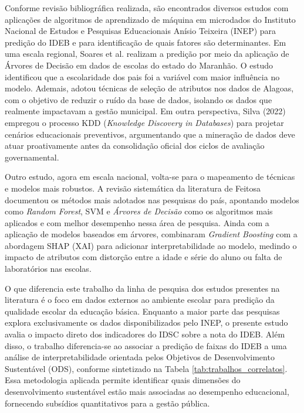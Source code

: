 Conforme revisão bibliográfica realizada, são encontrados diversos estudos com aplicações de algoritmos de aprendizado de máquina em microdados do Instituto Nacional de Estudos e Pesquisas Educacionais Anísio Teixeira (INEP) para predição do IDEB e para identificação de quais fatores são determinantes. Em uma escala regional, Soares et al.  realizam a predição por meio da aplicação de Árvores de Decisão em dados de escolas do estado do Maranhão. O estudo identificou que a escolaridade dos pais foi a variável com maior influência no modelo. Ademais,  adotou técnicas de seleção de atributos nos dados de Alagoas, com o objetivo de reduzir o ruído da base de dados, isolando os dados que realmente impactavam a gestão municipal. Em outra perspectiva, Silva (2022) empregou o processo KDD (\textit{Knowledge Discovery in Databases}) para projetar cenários educacionais preventivos, argumentando que a mineração de dados deve atuar proativamente antes da consolidação oficial dos ciclos de avaliação governamental.

Outro estudo, agora em escala nacional, volta-se para o mapeamento de técnicas e modelos mais robustos. A revisão sistemática da literatura de Feitosa  documentou os métodos mais adotados nas pesquisas do país, apontando modelos como \textit{Random Forest}, SVM e \textit{Árvores de Decisão} como os algoritmos mais aplicados e com melhor desempenho nessa área de pesquisa. Ainda com a aplicação de modelos baseados em árvores,  combinaram \textit{Gradient Boosting} com a abordagem SHAP (XAI) para adicionar interpretabilidade ao modelo, medindo o impacto de atributos com distorção entre a idade e série do aluno ou falta de laboratórios nas escolas. 

O que diferencia este trabalho da linha de pesquisa dos estudos presentes na literatura é o foco em dados externos ao ambiente escolar para predição da qualidade escolar da educação básica. Enquanto a maior parte das pesquisas explora exclusivamente os dados disponibilizados pelo INEP, o presente estudo avalia o impacto direto dos indicadores do IDSC sobre a nota do IDEB. Além disso, o trabalho diferencia-se ao associar a predição de faixas do IDEB a uma análise de interpretabilidade orientada pelos Objetivos de Desenvolvimento Sustentável (ODS), conforme sintetizado na Tabela \ref{tab:trabalhos_correlatos}. Essa metodologia aplicada permite identificar quais dimensões do desenvolvimento sustentável estão mais associadas ao desempenho educacional, fornecendo subsídios quantitativos para a gestão pública. 

